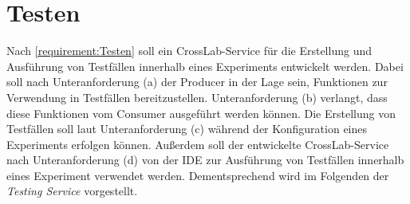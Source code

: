 \section{Testen}\label{section:konzeption:testen}


Nach \autoref{requirement:Testen} soll ein CrossLab-Service für die Erstellung und Ausführung von Testfällen innerhalb eines Experiments entwickelt werden. Dabei soll nach Unteranforderung (a) der Producer in der Lage sein, Funktionen zur Verwendung in Testfällen bereitzustellen. Unteranforderung (b) verlangt, dass diese Funktionen vom Consumer ausgeführt werden können. Die Erstellung von Testfällen soll laut Unteranforderung (c) während der Konfiguration eines Experiments erfolgen können. Außerdem soll der entwickelte CrossLab-Service nach Unteranforderung (d) von der IDE zur Ausführung von Testfällen innerhalb eines Experiment verwendet werden. Dementsprechend wird im Folgenden der \textit{Testing Service} vorgestellt.

